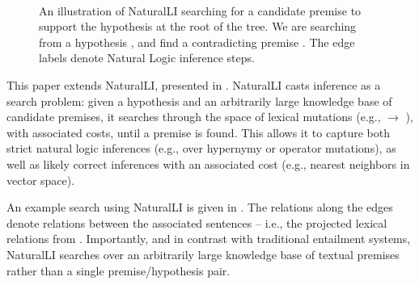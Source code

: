 %
%

\begin{figure}[t]
\begin{center}
  \resizebox{0.48\textwidth}{!}{\teaserSearch} \\
\end{center}
\caption{
  An illustration of NaturalLI searching for a candidate premise
  to support the hypothesis at the root of the tree.
  We are searching from a hypothesis
  , and find a contradicting
  premise .
  The edge labels denote Natural Logic inference steps.
  \label{fig:naturalli}
}
\end{figure}

This paper extends NaturalLI, presented in .
NaturalLI casts inference as a search problem: given a hypothesis and an arbitrarily
  large knowledge base of candidate premises, it searches through the space of
  lexical mutations (e.g.,  $\rightarrow$ ), 
  with associated costs, until a premise is found.
This allows it to capture both strict natural logic inferences (e.g., over hypernymy
  or operator mutations), as well as likely correct inferences with an associated
  cost (e.g., nearest neighbors in vector space).

An example search using NaturalLI is given in .
The relations along the edges denote relations between the associated sentences
  -- i.e., the projected lexical relations from .
Importantly, and in contrast with traditional entailment systems, NaturalLI
  searches over an arbitrarily large knowledge base of textual premises rather
  than a single premise/hypothesis pair.

